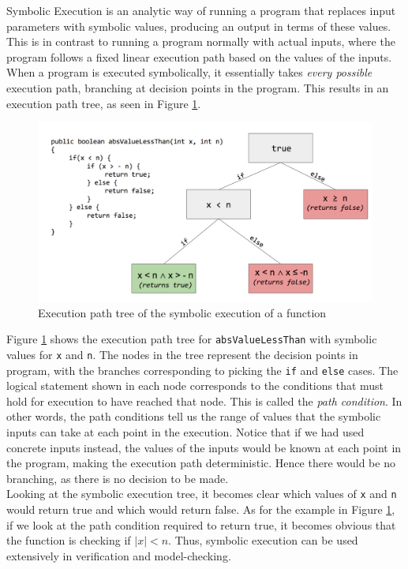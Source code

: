 \documentclass[titlepage,11pt]{article}
\begin{document}
Symbolic Execution is an analytic way of running a program that replaces input parameters with symbolic values, producing an output in terms of these values. This is in contrast to running a program normally with actual inputs, where the program follows a fixed linear execution path based on the values of the inputs. When a program is executed symbolically, it essentially takes \textit{every possible} execution path, branching at decision points in the program. This results in an execution path tree, as seen in Figure \ref{fig:symex}. \\

\begin{figure}[H]
\centering
\includegraphics[scale=0.5]{symex.png}
\caption{Execution path tree of the symbolic execution of a function}
\label{fig:symex}
\end{figure}

Figure \ref{fig:symex} shows the execution path tree for \texttt{absValueLessThan} with symbolic values for \texttt{x} and \texttt{n}. The nodes in the tree represent the decision points in program, with the branches corresponding to picking the \texttt{if} and \texttt{else} cases. The logical statement shown in each node corresponds to the conditions that must hold for execution to have reached that node. This is called the \textit{path condition}. In other words, the path conditions tell us the range of values that the symbolic inputs can take at each point in the execution. Notice that if we had used concrete inputs instead, the values of the inputs would be known at each point in the program, making the execution path deterministic. Hence there would be no branching, as there is no decision to be made. \\

Looking at the symbolic execution tree, it becomes clear which values of \texttt{x} and \texttt{n} would return true and which would return false. As for the example in Figure \ref{fig:symex}, if we look at the path condition required to return true, it becomes obvious that the function is checking if $|x| < n$. Thus, symbolic execution can be used extensively in verification and model-checking.
\end{document}

